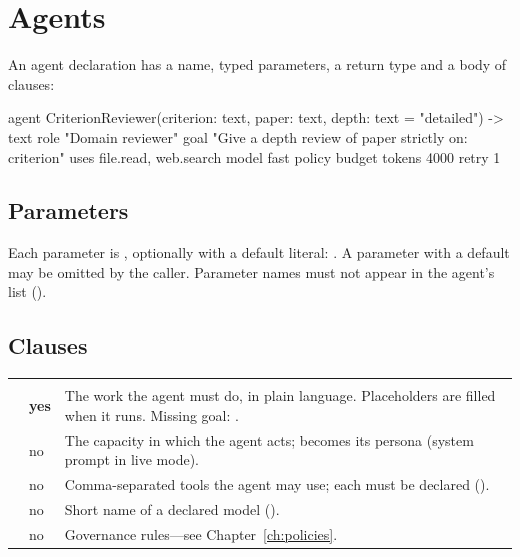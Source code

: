 \section{Agents}

An agent declaration has a name, typed parameters, a return type and a body of clauses:

\begin{algo}[title=agent anatomy]
agent CriterionReviewer(criterion: text, paper: text, depth: text = "detailed") -> text {
    role   "Domain reviewer"
    goal   "Give a {depth} review of {paper} strictly on: {criterion}"
    uses   file.read, web.search
    model  fast
    policy {
        budget tokens 4000
        retry 1
    }
}
\end{algo}

\subsection{Parameters}

Each parameter is , optionally with a default literal: . A parameter with a default may be omitted by the caller. Parameter names must not appear in the agent's  list ().

\subsection{Clauses}

\begin{center}
\small
\begin{tabularx}{\linewidth}{@{}L{1.6cm}L{1.8cm}Y@{}}
\toprule
{} &  & \\
\goldrule
{} & \textbf{yes} & The work the agent must do, in plain language. Placeholders  are filled when it runs. Missing goal: .\\
 & no & The capacity in which the agent acts; becomes its persona (system prompt in live mode).\\
 & no & Comma-separated tools the agent may use; each must be declared ().\\
 & no & Short name of a declared model ().\\
 & no & Governance rules---see Chapter~\ref{ch:policies}.\\
\bottomrule
\end{tabularx}
\end{center}

